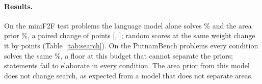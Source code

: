
\paragraph{Results.}
On the \resSearchProblemsMiniF{} miniF2F test problems the language model
alone solves \resSearchBaseMiniF\% and the area prior \resSearchAreaMiniF\%,
a paired change of \resSearchGainMiniF{} points
[\resSearchGainLoMiniF, \resSearchGainHiMiniF]; random scores at the same
weight change it by \resSearchRandomGainMiniF{} points
(Table~\ref{tab:search}). On the
\resSearchProblemsPutnam{} PutnamBench problems every condition solves the
same \resSearchBasePutnam\%, a floor at this budget that cannot separate the
priors; \resSearchStatementErrorsPutnam{} statements fail to elaborate in
every condition. The area prior from this model does not change search, as
expected from a model that does not separate areas.

\begin{table}[t]
  \caption{Problems solved (\%) under the same budget, \resSearchSeeds{}
  seed. The area prior uses the first factor of $g$ alone at
  $\lambda = 0.3$; random scores keeps the mixing rule and weight with random
  scores in place of the area scores.}
  \label{tab:search}
  \centering\small
\end{table}
